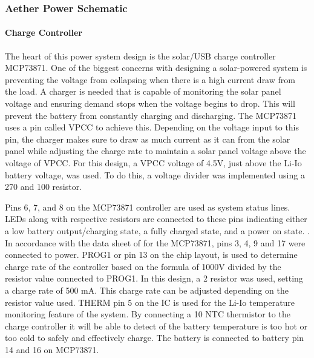 \subsubsection{Aether Power Schematic}
\paragraph{Charge Controller} The heart of this power system design is the solar/USB charge controller MCP73871. One of the biggest concerns with designing a solar-powered system is preventing the voltage from collapsing when there is a high current draw from the load. A charger is needed that is capable of monitoring the solar panel voltage and ensuring demand stops when the voltage begins to drop. This will prevent the battery from constantly charging and discharging. The MCP73871 uses a pin called VPCC to achieve this. Depending on the voltage input to this pin, the charger makes sure to draw as much current as it can from the solar panel while adjusting the charge rate to maintain a solar panel voltage above the voltage of VPCC. For this design, a VPCC voltage of 4.5V, just above the Li-Io battery voltage, was used. To do this, a voltage divider was implemented using a 270 \kOhm and 100 \kOhm resistor.

Pins 6, 7, and 8 on the MCP73871 controller are used as system status lines. LEDs along with respective resistors are connected to these pins indicating either a low battery output/charging state, a fully charged state, and a power on state. . In accordance with the data sheet of for the MCP73871, pins 3, 4, 9 and 17 were connected to power. PROG1 or pin 13 on the chip layout, is used to determine charge rate of the controller based on the formula of 1000V divided by the resistor value connected to PROG1. In this design, a 2 \kOhm resistor was used, setting a charge rate of 500 mA. This charge rate can be adjusted depending on the resistor value used. THERM pin 5 on the IC is used for the Li-Io temperature monitoring feature of the system. By connecting a 10 \kOhm NTC thermistor to the charge controller it will be able to detect of the battery temperature is too hot or too cold to safely and effectively charge. The battery is connected to battery pin 14 and 16 on MCP73871.

